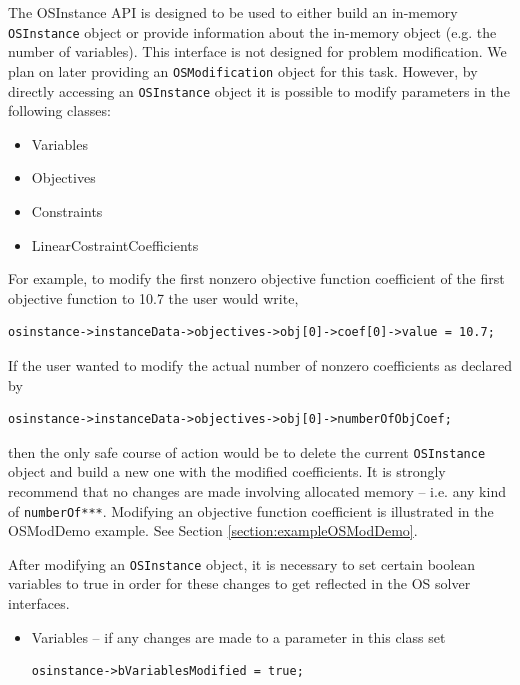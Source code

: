 \documentclass[11pt]{article}
\renewcommand{\_}{{\char"5F}}
\renewcommand{\{}{{\char"7B}}
\renewcommand{\}}{{\char"7D}}
\renewcommand{\^}{{\char"0D}}
\renewcommand{\'}{{\char"0D}}
\begin{document}
\begin{enumerate}[Step 1:]
The OSInstance API is designed to be used to either build an in-memory {\tt OSInstance} object or provide information about the in-memory object (e.g. the number of variables).   This interface is not designed for problem modification.  We plan on later providing an {\tt OSModification} object for this task. However, by directly accessing an {\tt OSInstance} object it is possible to modify parameters in the following classes:

\begin{itemize}
\item Variables

\item Objectives

\item Constraints

\item LinearCostraintCoefficients
\end{itemize}

For example, to modify the first nonzero objective function coefficient of the first objective  function to 10.7 the user would write,

\begin{verbatim}
osinstance->instanceData->objectives->obj[0]->coef[0]->value = 10.7;
\end{verbatim}
If the user wanted to modify the actual number of nonzero coefficients as declared by 
\begin{verbatim}
osinstance->instanceData->objectives->obj[0]->numberOfObjCoef;
\end{verbatim}
then the only safe course of action would be to delete the current {\tt OSInstance} object 
and build a new one  with the modified coefficients. It is strongly recommend that no changes 
are made involving allocated memory -- i.e. any kind of {\tt numberOf***}.  
Modifying an objective function coefficient is illustrated in the OSModDemo example. 
See Section \ref{section:exampleOSModDemo}.

After modifying an {\tt OSInstance} object, it is necessary to set certain boolean variables 
to true in order for these changes to get reflected in the OS solver interfaces.

\begin{itemize}
\item Variables -- if any changes are made to a parameter in this class set

\begin{verbatim}
osinstance->bVariablesModified = true;
\end{verbatim}


\end{itemize}
\end{enumerate}
\end{document}
